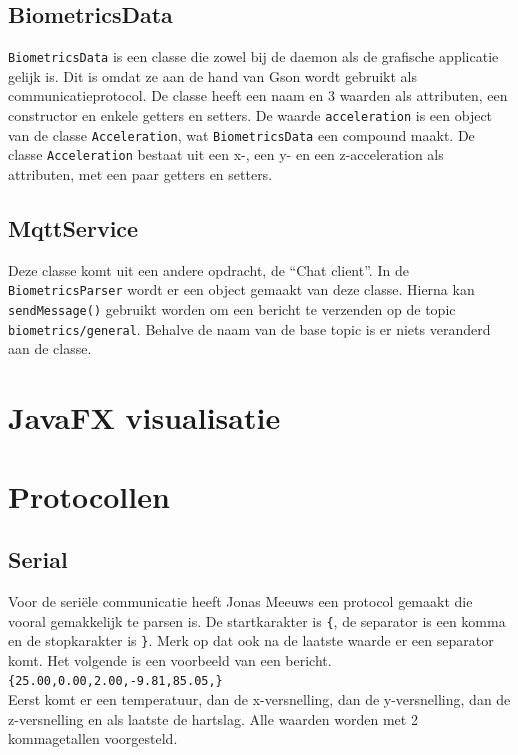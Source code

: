 \documentclass[a4paper]{report}
\newcommand{\code}[1]{\colorbox{light-gray}{\texttt{#1}}}
\begin{document}
        \subsection{BiometricsData}
            \code{BiometricsData} is een classe die zowel bij de daemon als de grafische applicatie gelijk is.
            Dit is omdat ze aan de hand van Gson wordt gebruikt als communicatieprotocol.
            De classe heeft een naam en 3 waarden als attributen, een constructor en enkele getters en setters.
            De waarde \code{acceleration} is een object van de classe \code{Acceleration}, wat \code{BiometricsData} een compound maakt.
            De classe \code{Acceleration} bestaat uit een x-, een y- en een z-acceleration als attributen, met een paar getters en setters.

        \subsection{MqttService}
            Deze classe komt uit een andere opdracht, de ``Chat client''.
            In de \linebreak\code{BiometricsParser} wordt er een object gemaakt van deze classe.
            Hierna kan \code{sendMessage()} gebruikt worden om een bericht te verzenden op de topic \code{biometrics/general}.
            Behalve de naam van de base topic is er niets veranderd aan de classe.

    \section{JavaFX visualisatie}
        
    \section{Protocollen}
        \subsection{Serial}
            Voor de seri\"ele communicatie heeft Jonas Meeuws een protocol gemaakt die vooral gemakkelijk te parsen is.
            De startkarakter is \verb!{!, de separator is een komma en de stopkarakter is \verb!}!.
            Merk op dat ook na de laatste waarde er een separator komt.
            Het volgende is een voorbeeld van een bericht.\\
            \indent \verb!{25.00,0.00,2.00,-9.81,85.05,}!\\
            Eerst komt er een temperatuur, dan de x-versnelling, dan de y-versnelling, dan de z-versnelling en als laatste de hartslag.
            Alle waarden worden met 2 kommagetallen voorgesteld.
            
\end{document}
